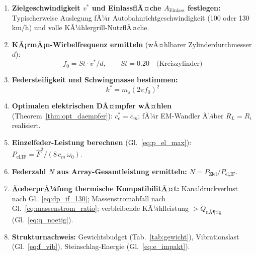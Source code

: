 ﻿\documentclass[12pt, a4paper]{report}
\theoremstyle{definition}
\theoremstyle{remark}
\newcommand{\Aeinlass}{A_{\text{Einlass}}}
\begin{document}
\begin{enumerate}[leftmargin=2em]
  \item \textbf{Zielgeschwindigkeit $v^*$ und EinlassflÃ¤che $\Aeinlass$ festlegen:}
        Typischerweise Auslegung fÃ¼r Autobahnrichtgeschwindigkeit
        (100 oder 130\,km/h) und volle KÃ¼hlergrill-NutzflÃ¤che.

  \item \textbf{KÃ¡rmÃ¡n-Wirbelfrequenz ermitteln} (wÃ¤hlbarer Zylinderdurchmesser $d$):
        \begin{equation}
          f_0 = St \cdot v^*/d, \qquad St = 0.20 \quad \text{(Kreiszylinder)}
          \label{eq:ausleg_f0}
        \end{equation}

  \item \textbf{Federsteifigkeit und Schwingmasse bestimmen:}
        \begin{equation}
          k^* = m_s (2\pi f_0)^2
          \label{eq:ausleg_k}
        \end{equation}

  \item \textbf{Optimalen elektrischen DÃ¤mpfer wÃ¤hlen} (Theorem~\ref{thm:opt_daempfer}):
        $c_e^* = c_m$; fÃ¼r EM-Wandler Ã¼ber $R_L = R_i$ realisiert.

  \item \textbf{Einzelfeder-Leistung berechnen} (Gl.~\eqref{eq:p_el_max}):
        $P_{\text{el,IF}} = \hat{F}^2 / (8\,c_m\,\omega_0)$.

  \item \textbf{Federzahl $N$ aus Array-Gesamtleistung ermitteln:}
        $N = P_{\text{Ziel}} / P_{\text{el,IF}}$.

  \item \textbf{ÃœberprÃ¼fung thermische KompatibilitÃ¤t:} Kanaldruckverlust nach
        Gl.~\eqref{eq:dp_if_130}; Massenstromabfall nach Gl.~\eqref{eq:massenstrom_ratio};
        verbleibende KÃ¼hlleistung $> \dot{Q}_{\text{nÃ¶tig}}$ (Gl.~\eqref{eq:q_noetig}).

  \item \textbf{Strukturnachweis:} Gewichtsbudget (Tab.~\ref{tab:gewicht}),
        Vi\-brations\-last (Gl.~\eqref{eq:f_vib}), Stein\-schlag-Energie
        (Gl.~\eqref{eq:e_impakt}).
\end{enumerate}

\end{document}
